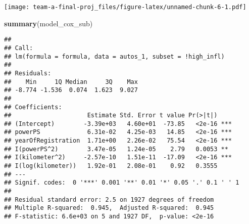 \documentclass[]{article}
\newenvironment{Shaded}{\begin{snugshade}}{\end{snugshade}}
\newcommand{\CommentTok}[1]{\textcolor[rgb]{0.56,0.35,0.01}{\textit{#1}}}
\newcommand{\DataTypeTok}[1]{\textcolor[rgb]{0.13,0.29,0.53}{#1}}
\newcommand{\DecValTok}[1]{\textcolor[rgb]{0.00,0.00,0.81}{#1}}
\newcommand{\KeywordTok}[1]{\textcolor[rgb]{0.13,0.29,0.53}{\textbf{#1}}}
\newcommand{\NormalTok}[1]{#1}
\newcommand{\OperatorTok}[1]{\textcolor[rgb]{0.81,0.36,0.00}{\textbf{#1}}}
\newcommand{\StringTok}[1]{\textcolor[rgb]{0.31,0.60,0.02}{#1}}
\begin{document}
\begin{Shaded}
\end{Shaded}

\texttt{[image: team-a-final-proj\_files/figure-latex/unnamed-chunk-6-1.pdf]}

\begin{Shaded}
\begin{Highlighting}[]
\KeywordTok{summary}\NormalTok{(model_cox_sub)}
\end{Highlighting}
\end{Shaded}

\begin{verbatim}
## 
## Call:
## lm(formula = formula, data = autos_1, subset = !high_infl)
## 
## Residuals:
##    Min     1Q Median     3Q    Max 
## -8.774 -1.536  0.074  1.623  9.027 
## 
## Coefficients:
##                     Estimate Std. Error t value Pr(>|t|)    
## (Intercept)        -3.39e+03   4.60e+01  -73.85   <2e-16 ***
## powerPS             6.31e-02   4.25e-03   14.85   <2e-16 ***
## yearOfRegistration  1.71e+00   2.26e-02   75.54   <2e-16 ***
## I(powerPS^2)        3.47e-05   1.24e-05    2.79   0.0053 ** 
## I(kilometer^2)     -2.57e-10   1.51e-11  -17.09   <2e-16 ***
## I(log(kilometer))   1.92e-01   2.08e-01    0.92   0.3555    
## ---
## Signif. codes:  0 '***' 0.001 '**' 0.01 '*' 0.05 '.' 0.1 ' ' 1
## 
## Residual standard error: 2.5 on 1927 degrees of freedom
## Multiple R-squared:  0.945,  Adjusted R-squared:  0.945 
## F-statistic: 6.6e+03 on 5 and 1927 DF,  p-value: <2e-16
\end{verbatim}
\end{document}
